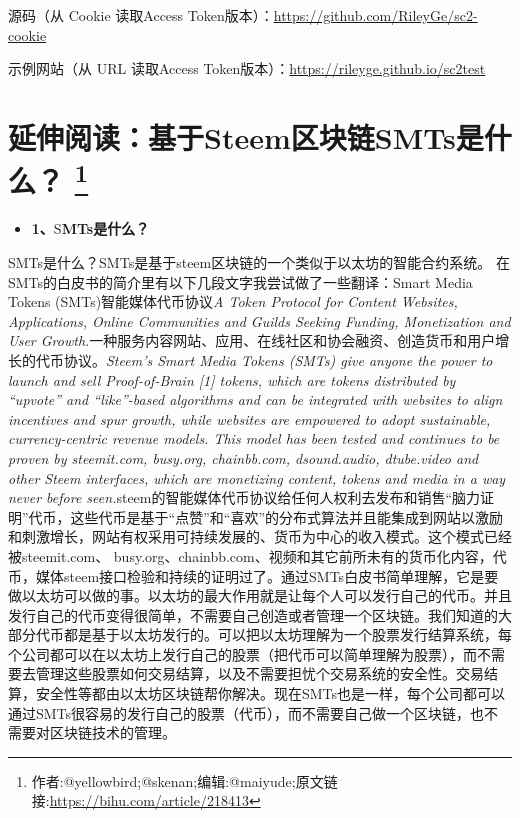 \documentclass[]{ctexbook}
\providecommand{\tightlist}{%
  \setlength{\itemsep}{0pt}\setlength{\parskip}{0pt}}
\begin{document}
源码（从 Cookie 读取Access Token版本）：\url{https://github.com/RileyGe/sc2-cookie}

示例网站（从 URL 读取Access Token版本）：\url{https://rileyge.github.io/sc2test}

\hypertarget{steemsmts}{%
\section[延伸阅读：基于Steem区块链SMTs是什么？ ]{\texorpdfstring{延伸阅读：基于Steem区块链SMTs是什么？ \footnote{作者:@yellowbird;@skenan;编辑:@maiyude;原文链接:\url{https://bihu.com/article/218413}}}{延伸阅读：基于Steem区块链SMTs是什么？ }}\label{steemsmts}}

\begin{itemize}
\tightlist
\item
  \textbf{1、}S\textbf{MTs是什么？}
\end{itemize}

SMTs是什么？SMTs是基于steem区块链的一个类似于以太坊的智能合约系统。 在SMTs的白皮书的简介里有以下几段文字我尝试做了一些翻译：Smart Media Tokens (SMTs)智能媒体代币协议\emph{A Token Protocol for Content Websites, Applications, Online Communities and Guilds Seeking Funding, Monetization and User Growth.}一种服务内容网站、应用、在线社区和协会融资、创造货币和用户增长的代币协议。\emph{Steem's Smart Media Tokens (SMTs) give anyone the power to launch and sell Proof-of-Brain {[}1{]} tokens, which are tokens distributed by ``upvote'' and ``like''-based algorithms and can be integrated with websites to align incentives and spur growth, while websites are empowered to adopt sustainable, currency-centric revenue models. This model has been tested and continues to be proven by steemit.com, busy.org, chainbb.com, dsound.audio, dtube.video and other Steem interfaces, which are monetizing content, tokens and media in a way never before seen.}steem的智能媒体代币协议给任何人权利去发布和销售``脑力证明''代币，这些代币是基于``点赞''和``喜欢''的分布式算法并且能集成到网站以激励和刺激增长，网站有权采用可持续发展的、货币为中心的收入模式。这个模式已经被steemit.com、 busy.org、chainbb.com、视频和其它前所未有的货币化内容，代币，媒体steem接口检验和持续的证明过了。通过SMTs白皮书简单理解，它是要做以太坊可以做的事。以太坊的最大作用就是让每个人可以发行自己的代币。并且发行自己的代币变得很简单，不需要自己创造或者管理一个区块链。我们知道的大部分代币都是基于以太坊发行的。可以把以太坊理解为一个股票发行结算系统，每个公司都可以在以太坊上发行自己的股票（把代币可以简单理解为股票），而不需要去管理这些股票如何交易结算，以及不需要担忧个交易系统的安全性。交易结算，安全性等都由以太坊区块链帮你解决。现在SMTs也是一样，每个公司都可以通过SMTs很容易的发行自己的股票（代币），而不需要自己做一个区块链，也不需要对区块链技术的管理。
\end{document}

